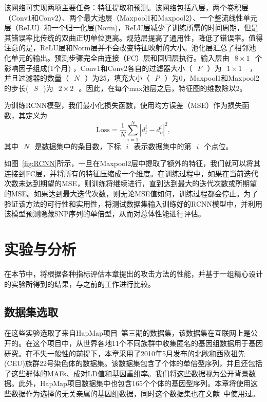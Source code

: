 该网络可实现两项主要任务：特征提取和预测。该网络包括八层，两个卷积层（Conv1和Conv2）、两个最大池层（Maxpool1和Maxpool2）、一个整流线性单元层（ReLU）和一个归一化层(Norm)，ReLU层减少了训练所需的时间周期，但是其错误率比传统的双曲正切单位更高。规范层提高了通用性，降低了错误率。值得注意的是，ReLU层和Norm层并不会改变特征映射的大小。池化层汇总了相邻池化单元的输出。预测步骤完全由连接（FC）层和回归层执行。输入层由~$~8\times 1~$~个影响因子组成(1个月) ，Conv1和Conv2各自的过滤器大小（~$~F~$~）为~$~1\times 1~$~ ，并且过滤器的数量（~$~N~$~）为25，填充大小（~$~P~$~）为0，Maxpool1和Maxpool2的步长(~$~S~$~)为~$~2\times 2~$~。因此，在每个max池层之后，特征图的维数除以2。


为训练RCNN模型，我们最小化损失函数，使用均方误差（MSE）作为损失函数，其定义为
\begin{equation}
\text{Loss}=\frac{1}{N}\sum_{i=1}^{N}|d_{t}^{i}-d_{o}^{i}|^{2},
\end{equation}
其中~$~N~$~是数据集中的条目数，下标~$~i~$~表示数据集中的第~$~i~$~个点位。


如图~\ref{fig:RCNN}所示，一旦在Maxpool2层中提取了额外的特征，我们就可以将其连接到FC层，并将所有的特征压缩成一个维度。在训练过程中，如果在当前迭代次数未达到期望的MSE，则训练将继续进行，直到达到最大的迭代次数或所期望的MSE。如果达到最大迭代次数，则无论MSE值如何，训练过程都会停止。为了验证该方法的可行性和实用性，将测试数据集输入训练好的RCNN模型中，并利用该模型预测隐藏SNP序列的单倍型，从而对总体性能进行评估。


\section{实验与分析}\label{sec:resul}
在本节中，将根据各种指标评估本章提出的攻击方法的性能，并基于一组精心设计的实验所得到的结果，与之前的工作进行比较。

\subsection{数据集选取}
在这些实验选取了来自HapMap项目~\cite{thorisson2005international}第三期的数据集，该数据集在互联网上是公开的。在这个项目中，从世界各地11个不同族群中收集匿名的基因组数据用于基因研究。在不失一般性的前提下，本章采用了2010年5月发布的北欧和西欧祖先(CEU)族群22号染色体的数据集。该数据集包含了个体的单倍型序列，并且还包括了这些群体的MAFs、成对LD值和基因重组率。我们将这些数据视为公开背景数据。此外，HapMap项目数据集中也包含165个个体的基因型序列。本章将使用这些数据作为选择的无关亲属的基因组数据，同时这个数据集也在文献~\cite{samani2015quantifying}中使用过。
